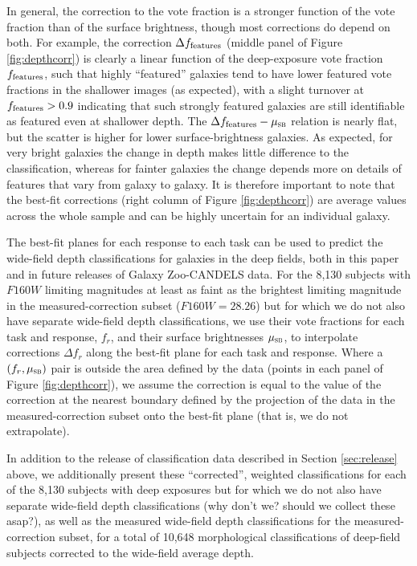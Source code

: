 \documentclass[useAMS,usenatbib]{mn2e}
\def\notecsm	{\color{titlecol2}}
\def\musb       {$\mu_{\rm{\textsc{sb}}}$}
\def\mmusb     {\mu_{\rm{\textsc{sb}}}}
\begin{document}
{In general, the correction to the vote fraction is a stronger function of the vote fraction than of the surface brightness, though most corrections do depend on both. For example, the correction $\Delta f_{\rm features}$ (middle panel of Figure \ref{fig:depthcorr}) is clearly a linear function of the deep-exposure vote fraction $f_{\rm features}$, such that highly ``featured'' galaxies tend to have lower featured vote fractions in the shallower images (as expected), with a slight turnover at $f_{\rm features} > 0.9$ indicating that such strongly featured galaxies are still identifiable as featured even at shallower depth. The $\Delta f_{\rm features}-\mmusb$ relation is nearly flat, but the scatter is higher for lower surface-brightness galaxies. As expected, for very bright galaxies the change in depth makes little difference to the classification, whereas for fainter galaxies the change depends more on details of features that vary from galaxy to galaxy. It is therefore important to note that the best-fit corrections (right column of Figure \ref{fig:depthcorr}) are average values across the whole sample and can be highly uncertain for an individual galaxy.

The best-fit planes for each response to each task can be used to predict the wide-field depth classifications for galaxies in the deep fields, both in this paper and in future releases of Galaxy Zoo-CANDELS data.  For the 8,130 subjects with $F160W$ limiting magnitudes at least as faint as the brightest limiting magnitude in the measured-correction subset ($F160W = 28.26$) but for which we do not also have separate wide-field depth classifications, we use their vote fractions for each task and response, $f_r$, and their surface brightnesses \musb , to interpolate corrections $\Delta f_r$ along the best-fit plane for each task and response. Where a $\left( f_r, \mmusb \right)$ pair is outside the area defined by the data (points in each panel of Figure \ref{fig:depthcorr}), we assume the correction is equal to the value of the correction at the nearest boundary defined by the projection of the data in the measured-correction subset onto the best-fit plane (that is, we do not extrapolate). 

In addition to the release of classification data described in Section \ref{sec:release} above, we additionally present these ``corrected'', weighted classifications for each of the 8,130 subjects with deep exposures but for which we do not also have separate wide-field depth classifications {\notecsm (why don't we? should we collect these asap?)}, as well as the measured wide-field depth classifications for the measured-correction subset, for a total of 10,648 morphological classifications of deep-field subjects corrected to the wide-field average depth.

}
\end{document}
